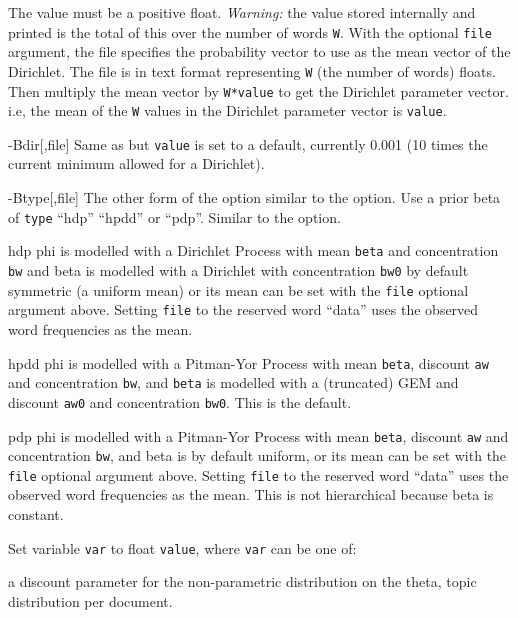 \documentclass[a4paper,english]{article}
\begin{document}
\begin{Description}
The value must be a positive float.
\emph{Warning:}
 the value stored internally and printed is the total of this over the
number of words \texttt{W}.
With the optional \texttt{file} argument, the file
specifies the probability vector to use as the mean vector of the
Dirichlet. The file is in text format representing  \texttt{W} 
(the number of words) floats.
Then multiply the mean vector by \texttt{W*value} 
to get the Dirichlet parameter vector.
i.e, the mean of the \texttt{W} values 
in the Dirichlet parameter vector is \texttt{value}.
\item[{-B}{dir[,file]}]  Same as  but
\texttt{value} is set to a default, currently 0.001
(10 times the current minimum allowed for a Dirichlet).
\item[{-B}{type[,file]}] 
The other form of the  option
similar to the  option.
Use a prior beta of \texttt{type}
``hdp'' ``hpdd'' or ``pdp''.  Similar to the  option.
\begin{Description}[hpdd]
\item[hdp] phi is modelled with a Dirichlet Process
with mean \texttt{beta} and concentration \texttt{bw} and 
beta is modelled with a Dirichlet with concentration \texttt{bw0}
by default symmetric (a uniform mean)
or its mean can be set with the \texttt{file} optional argument above.
Setting \texttt{file} to the reserved word ``data''
uses the observed word frequencies as the mean.
\item[hpdd] 
phi is modelled with a Pitman-Yor Process
with mean \texttt{beta}, discount \texttt{aw} and concentration \texttt{bw},
and \texttt{beta} is modelled with a (truncated) GEM 
and discount \texttt{aw0} and concentration \texttt{bw0}.
This is the default.
\item[pdp]
 phi is modelled with a Pitman-Yor Process
with mean \texttt{beta}, discount \texttt{aw} and concentration \texttt{bw},
and beta is by default uniform,
or its mean can be set with the \texttt{file} optional argument above.
Setting \texttt{file} to the reserved word ``data''
uses the observed word frequencies as the mean.
This is not hierarchical because beta is constant.
\end{Description}
\item[\OptArg{-S}{var=value}]  Set variable \texttt{var} to float \texttt{value},
where \texttt{var} can be one of:
\begin{Description}[bdk]
\item[a] discount parameter for the non-parametric distribution
  on the theta, topic distribution per document.

\end{Description}
\end{Description}
\end{document}
